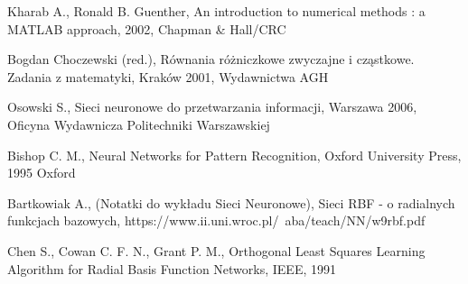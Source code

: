 \begin{thebibliography}{widest-label}
Kharab A., Ronald B. Guenther, An introduction to numerical methods : a MATLAB approach, 2002, Chapman \& Hall/CRC

Bogdan Choczewski (red.), Równania różniczkowe zwyczajne i cząstkowe. Zadania z matematyki, Kraków 2001, Wydawnictwa AGH

Osowski S., Sieci neuronowe do przetwarzania informacji, Warszawa 2006, Oficyna Wydawnicza Politechniki Warszawskiej

Bishop C. M., Neural Networks for Pattern Recognition, Oxford University Press, 1995 Oxford

 Bartkowiak A., (Notatki do wykładu Sieci Neuronowe), Sieci RBF - o radialnych funkcjach bazowych, https://www.ii.uni.wroc.pl/~aba/teach/NN/w9rbf.pdf

 Chen S., Cowan C. F. N., Grant P. M., Orthogonal Least Squares Learning Algorithm for Radial Basis Function Networks, IEEE, 1991

\end{thebibliography}


